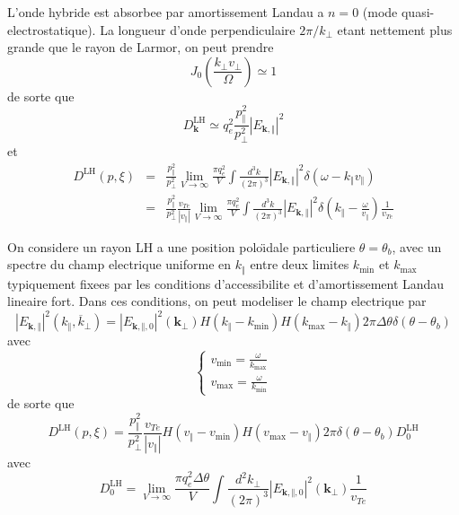 L'onde hybride est absorbee par amortissement Landau a $n=0$ (mode
quasi-electrostatique). La longueur d'onde perpendiculaire $2\pi/k_{\bot}$
etant nettement plus grande que le rayon de Larmor, on peut prendre
\[
J_{0}\left(\frac{k_{\bot}v_{\bot}}{\Omega}\right)\simeq1\]
 de sorte que \[
D_{\mathbf{k}}^{\text{LH}}\simeq q_{e}^{2}\frac{p_{\Vert}^{2}}{p_{\bot}^{2}}\left|E_{\mathbf{k},\Vert}\right|^{2}\]
 et \begin{eqnarray*}
D^{\text{LH}}(p,\xi) & = & \frac{p_{\Vert}^{2}}{p_{\bot}^{2}}\lim_{V\rightarrow\infty}\frac{\pi q_{e}^{2}}{V}\int\frac{d^{3}k}{(2\pi)^{3}}\left|E_{\mathbf{k},\Vert}\right|^{2}\delta(\omega-k_{\Vert}v_{\Vert})\\
 & = & \frac{p_{\Vert}^{2}}{p_{\bot}^{2}}\frac{v_{Te}}{\left|v_{\Vert}\right|}\lim_{V\rightarrow\infty}\frac{\pi q_{e}^{2}}{V}\int\frac{d^{3}k}{(2\pi)^{3}}\left|E_{\mathbf{k},\Vert}\right|^{2}\delta\left(k_{\Vert}-\frac{\omega}{v_{\Vert}}\right)\frac{1}{v_{Te}}\end{eqnarray*}


On considere un rayon LH a une position polo\"{\i}dale particuliere
$\theta=\theta_{b}$, avec un spectre du champ electrique uniforme
en $k_{\Vert}$ entre deux limites $k_{\min}$ et $k_{\max}$ typiquement
fixees par les conditions d'accessibilite et d'amortissement Landau
lineaire fort. Dans ces conditions, on peut modeliser le champ electrique
par \[
\left|E_{\mathbf{k},\Vert}\right|^{2}(k_{\Vert},\overline{k}_{\bot})=\left|E_{\mathbf{k},\Vert,0}\right|^{2}(\mathbf{k}_{\bot})H(k_{\Vert}-k_{\min})H(k_{\max}-k_{\Vert})2\pi\Delta\theta\delta(\theta-\theta_{b})\]
 avec \[
\left\{ \begin{array}{l}
v_{\min}=\frac{\omega}{k_{\max}}\\
v_{\max}=\frac{\omega}{k_{\min}}\end{array}\right.\]
 de sorte que \[
D^{\text{LH}}(p,\xi)=\frac{p_{\Vert}^{2}}{p_{\bot}^{2}}\frac{v_{Te}}{\left|v_{\Vert}\right|}H(v_{\Vert}-v_{\min})H(v_{\max}-v_{\Vert})2\pi\delta(\theta-\theta_{b})D_{0}^{\text{LH}}\]
 avec \[
D_{0}^{\text{LH}}=\lim_{V\rightarrow\infty}\frac{\pi q_{e}^{2}\Delta\theta}{V}\int\frac{d^{2}k_{\bot}}{(2\pi)^{3}}\left|E_{\mathbf{k},\Vert,0}\right|^{2}(\mathbf{k}_{\bot})\frac{1}{v_{Te}}\]


